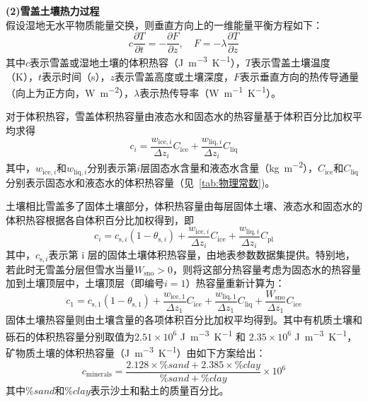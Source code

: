 \textbf {(2)雪盖土壤热力过程}\\

假设湿地无水平物质能量交换，则垂直方向上的一维能量平衡方程如下：
\begin{equation}\label{eq:WetlandThermalCons1}
  c \frac{\partial T}{\partial t}=-\frac{\partial F}{\partial z},  \quad F=-\lambda \frac{\partial T}{\partial z}
\end{equation}
其中$c$表示雪盖或湿地土壤的体积热容（\unit{J.m^{-3}.K^{-1}}），$T$表示雪盖土壤温度（K），$t$表示时间（s），$z$表示雪盖高度或土壤深度，$F$表示垂直方向的热传导通量（向上为正方向，\unit{W.m^{-2}}），$\lambda$表示热传导率（\unit{W.m^{-1}.K^{-1}}）。

对于体积热容，雪盖体积热容量由液态水和固态水的热容量基于体积百分比加权平均求得
\begin{equation}
  c_{i}=\frac{w_{\mathrm{ice},i}}{\Delta z_{i}} C_{\mathrm{ice}}+\frac{w_{\mathrm{liq},i}}{\Delta z_{i}} C_{\mathrm{liq}}
\end{equation}
其中，$w_{\mathrm{ice},i}$和$w_{\mathrm{liq},i}$分别表示第$i$层固态水含量和液态水含量（\unit{kg.m^{-2}}），$C_{\mathrm{ice}}$和$C_{\mathrm{liq}}$分别表示固态水和液态水的体积热容量（见~\ref{tab:物理常数})。

土壤相比雪盖多了固体土壤部分，体积热容量由每层固体土壤、液态水和固态水的体积热容根据各自体积百分比加权得到，即
\begin{equation}
  c_{i}=c_{\mathrm{s},i}\left(1-\theta_{\mathrm{s},i}\right)+\frac{w_{\mathrm{ice},i}}{\Delta z_{i}} C_{\mathrm{ice}}+\frac{w_{\mathrm{liq},i}}{\Delta z_{i}} C_{\mathrm{p l}}
\end{equation}
其中，$c_{\mathrm{s},i}$表示第 i 层的固体土壤体积热容量，由地表参数数据集提供。特别地，若此时无雪盖分层但雪水当量$W_{\mathrm{sno}}>0$，则将这部分热容量考虑为固态水的热容量加到土壤顶层中，土壤顶层（即编号$i=1$）热容量重新计算为：
\begin{equation}
  c_{1}=c_{\mathrm{s,1}}\left(1-\theta_{\mathrm{s, 1}}\right)+\frac{w_{\mathrm{ice, 1}}}{\Delta z_{1}} C_{\mathrm{ice}}+\frac{w_{\mathrm{liq,1}}}{\Delta z_{1}} C_{\mathrm{liq}}+\frac{W_{\mathrm{sno}}}{\Delta z_{1}} C_{\mathrm{ice}}
\end{equation}
固体土壤热容量则由土壤含量的各项体积百分比加权平均得到。其中有机质土壤和砾石的体积热容量分别取值为$2.51 \times 10^{6}$ \unit{J.m^{−3}.K^{−1}} 和 $2.35 \times 10^{6}$ \unit{J.m^{−3}.K^{−1}}，矿物质土壤的体积热容量（\unit{J.m^{−3}.K^{−1}}）由如下方案给出：
\begin{equation}
  c_{\mathrm{minerals}}=\frac{2.128\times\%sand+2.385\times\%clay}{\%sand+\%clay}\times10^6
\end{equation}
其中$\%sand$和$\%clay$表示沙土和黏土的质量百分比。


